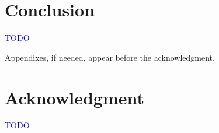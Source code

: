 \documentclass{ieeeaccess}
\begin{document}


\section{Conclusion}
\label{sec:conclusion}

\textcolor{blue}{TODO}

\appendices

Appendixes, if needed, appear before the acknowledgment.

\section*{Acknowledgment}

\textcolor{blue}{TODO}
\end{document}
